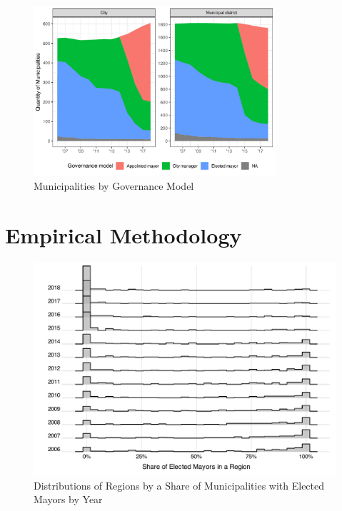 \documentclass[12pt]{article}
\numberwithin{equation}{section}
\numberwithin{table}{section}
\numberwithin{figure}{section}
\begin{document}
\begin{figure}[!htbp]\centering
  \caption{Municipalities by Governance Model}
  \label{fig:municipalities}
  \includegraphics[width=0.8\textwidth]{Figures/model_by_year_plot.pdf}
\end{figure}



\newpage

\section{Empirical Methodology}





\begin{figure}[!htbp]\centering
    \caption{Distributions of Regions by a Share of Municipalities with Elected Mayors by Year}
    \includegraphics[width=\textwidth]{Figures/ridgeplot_models.pdf}
\end{figure}
\end{document}
